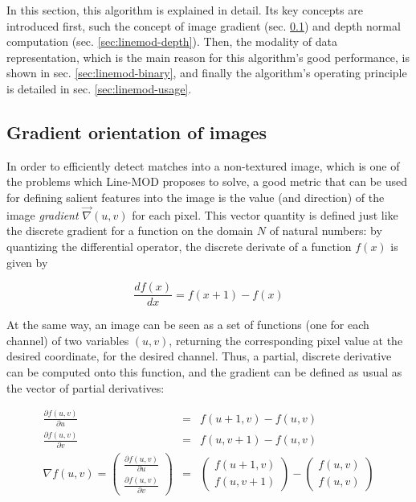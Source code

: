 In this section, this algorithm is explained in detail. Its key concepts are
introduced first, such the concept of image gradient (sec.
\ref{sec:linemod-gradient}) and depth normal computation (sec.
\ref{sec:linemod-depth}). Then, the modality of data representation, which is
the main reason for this algorithm's good performance, is shown in sec.
\ref{sec:linemod-binary}, and finally the algorithm's operating principle is
detailed in sec. \ref{sec:linemod-usage}.

\subsection{Gradient orientation of images} \label{sec:linemod-gradient}
In order to efficiently detect matches into a non-textured image, which is one
of the problems which Line-MOD proposes to solve, a good metric that can be
used for defining salient features into the image is the value (and direction)
of the image \emph{gradient} $\vec{\nabla} (u,v)$ for each pixel. This vector
quantity is defined just like the discrete gradient for a function on the
domain $N$ of natural numbers: by quantizing the differential operator, the
discrete derivate of a function $f(x)$ is given by

\begin{equation}
\frac{df(x)}{dx}=f(x+1)-f(x)
\end{equation}

At the same way, an image can be seen as a set of  functions (one for each
channel) of two variables $(u,v)$, returning the corresponding pixel value at
the desired coordinate, for the desired channel. Thus, a partial, discrete
derivative can be computed onto this function, and the gradient can be defined
as usual as the vector of partial derivatives:

\begin{eqnarray}
\frac{\partial f(u,v)}{\partial u} & = & f(u+1,v)-f(u,v) \\
\frac{\partial f(u,v)}{\partial v} & = & f(u,v+1)-f(u,v) \\
\nabla f(u,v) = \begin{pmatrix} \frac{\partial f(u,v)}{\partial u} \\
\frac{\partial f(u,v)}{\partial v} \end{pmatrix} & = &
\begin{pmatrix}f(u+1,v)\\ f(u,v+1)\end{pmatrix}-\begin{pmatrix}f(u,v) \\
f(u,v)\end{pmatrix}
\end{eqnarray}


